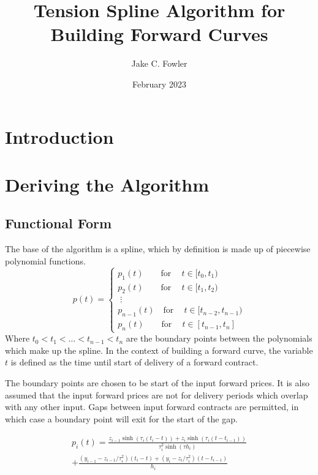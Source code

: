 \documentclass{article}
\title{Tension Spline Algorithm for Building Forward Curves}
\author{Jake C. Fowler}
\date{February 2023}
\begin{document}
\newcommand{\+}[1]{\ensuremath{\mathbf{#1}}}

\maketitle

\section{Introduction}

\section{Deriving the Algorithm}
\subsection{Functional Form}
The base of the algorithm is a spline, which by definition is made up of piecewise polynomial functions.
\begin{equation}
p(t) = 
\begin{cases}
    p_1(t)\qquad \text{for}\ \quad t \in [t_0, t_1) \\
    p_2(t)\qquad \text{for}\ \quad t \in [t_1, t_2) \\
    \;\vdots \\
    p_{n-1}(t)\quad \text{for}\ \quad t \in [t_{n-2}, t_{n-1}) \\
    p_n(t)\qquad \text{for}\ \quad t \in [t_{n-1}, t_n]
\end{cases}
\end{equation}
Where $t_0 < t_1 < \hdots < t_{n-1} < t_{n}$ are the boundary points between the polynomials which make up the spline.
In the context of building a forward curve, the variable $t$ is defined as
the time until start of delivery of a forward contract.

\bigskip

The boundary points are chosen to be start of the input forward prices. It is also
assumed that the input forward prices are not for delivery periods which overlap
with any other input. Gaps between input forward contracts are permitted, in which
case a boundary point will exit for the start of the gap.

\bigskip

\begin{multline}
p_i(t) = \frac{z_{i-1} \sinh(\tau_i (t_i - t)) + z_i \sinh(\tau_i (t - t_{i-1}))}{\tau_i^2 \sinh(\tau h_i)}  \\
    + \frac{(y_{i-1} - z_{i-1}/\tau_i^2)(t_i - t) + (y_i - z_i/\tau_i^2)(t - t_{i-1})}{h_i}
\end{multline}
\end{document}
